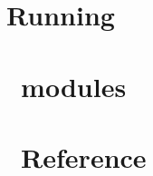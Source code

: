 \documentclass[12pt]{article}
\begin{document}
\section{Running \PSIthree} \label{running}


\section{\PSIthree\ modules} \label{modules}


\newpage
\appendix
\section{\PSIthree\ Reference}\label{PSI_Reference}






\end{document}
